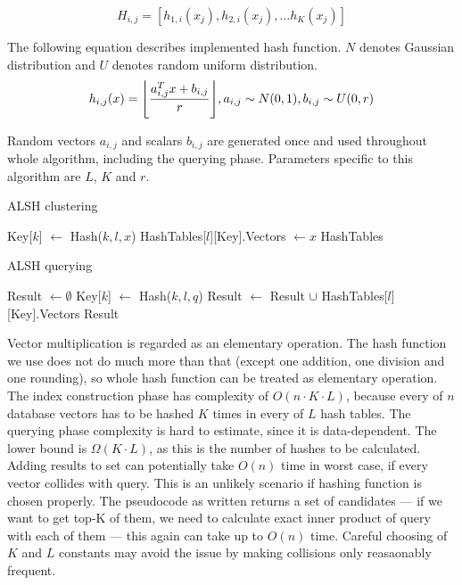 $$H_{i,j} = [h_{1,i}(x_j), h_{2,i}(x_j), \dots h_K(x_j)]$$

The following equation describes implemented hash function.
$N$ denotes Gaussian distribution and $U$ denotes random uniform distribution.
\begin{equation*}
h_{i,j}(x) = \floor*{\frac{a_{i,j}^T x + b_{i,j}}{r}}, a_{i,j} \sim N(0,1), b_{i,j} \sim U(0,r)
\end{equation*}
\par
Random vectors $a_{i,j}$ and scalars $b_{i,j}$ are generated once and used throughout whole
algorithm, including the querying phase. Parameters specific to this algorithm are $L$, $K$ and $r$.

\begin{algorithm}
	\caption{ALSH clustering}
	\begin{algorithmic}
				\State Key[$k$] $\gets$ Hash($k, l, x$)
			\EndFor
			\State HashTables[$l$][Key].Vectors $\gets x$
		\EndFor
		\State \Return HashTables
	\end{algorithmic}
\end{algorithm}

\begin{algorithm}
	\caption{ALSH querying}
	\begin{algorithmic}
		\State Result $\gets \emptyset$
		\For{$l = 0, 1, \dots, L$}
			\For{$k = 0, 1, \dots, K$}
				\State Key[$k$] $\gets$ Hash($k, l, q$)
			\EndFor
			\State Result $\gets$ Result $\cup$ HashTables[$l$][Key].Vectors
		\EndFor
		\State \Return Result
	\end{algorithmic}
\end{algorithm}

Vector multiplication is regarded as an elementary operation.
The hash function we use does not do much more than that (except one addition,
one division and one rounding),
so whole hash function can be treated as elementary operation.
The index construction phase has complexity of $O(n \cdot K \cdot L)$,
because every of $n$ database vectors
has to be hashed $K$ times in every of $L$ hash tables.
The querying phase complexity is hard to estimate, since it is data-dependent.
The lower bound is $\Omega(K \cdot L)$, as this is the number of hashes to be
calculated. Adding results to set can potentially take $O(n)$ time in worst
case, if every vector collides with query. This is an unlikely scenario if
hashing function is chosen properly. The pseudocode as written returns a set
of candidates --- if we want to get top-K of them, we need to calculate exact
inner product of query with each of them --- this again can take up to
$O(n)$ time. Careful choosing of $K$ and $L$ constants may avoid the issue
by making collisions only reasaonably frequent.


